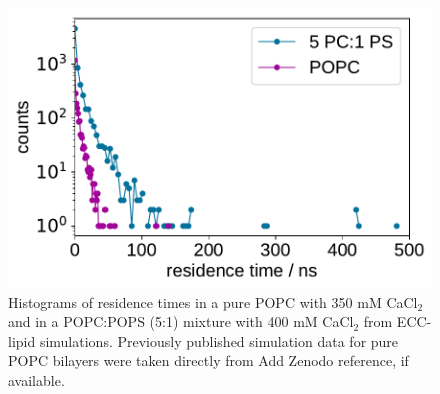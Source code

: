 \documentclass[journal=jpcbfk,manuscript=article]{achemso}
\newlength{\figwidth}
\begin{document}



\begin{figure}[!h]
  \centering
  \includegraphics[width=\figwidth]{../img/histogram_bound_times_26CaCl2_comparison_PC-PCPS.pdf}
  \caption{\label{fig:hist_residence_times}
    Histograms of   residence times in a pure POPC with 350 mM CaCl$_2$
    and in a POPC:POPS (5:1) mixture with 400 mM CaCl$_2$ from ECC-lipid simulations.
    Previously published simulation data \cite{melcr18} for pure POPC bilayers were taken directly from \cite{ECC-POPC_nacl_cacl2_files} Add Zenodo reference, if available. 
  }
\end{figure}



 
 
\end{document}
